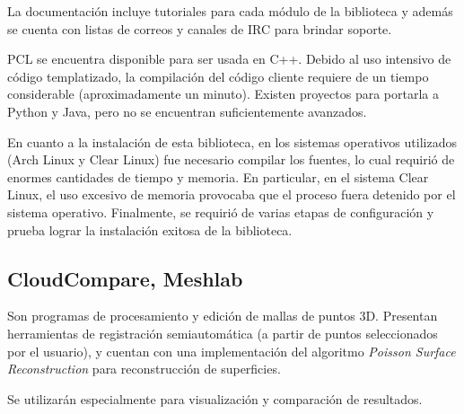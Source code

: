 	La documentación incluye tutoriales para cada módulo de la biblioteca y
	además se cuenta con listas de correos y canales de IRC para brindar
	soporte.

	PCL se encuentra disponible para ser usada en C++.
	Debido al uso intensivo de código templatizado, la compilación del
	código cliente requiere de un tiempo considerable (aproximadamente un minuto).
	Existen proyectos para portarla a Python y Java, pero no se encuentran
	suficientemente avanzados.

	En cuanto a la instalación de esta biblioteca, en los sistemas operativos
	utilizados (Arch Linux y Clear Linux) fue necesario compilar los fuentes,
	lo cual requirió de enormes cantidades de tiempo y memoria.
	En particular, en el sistema Clear Linux, el uso excesivo de memoria provocaba
	que el proceso fuera detenido por el sistema operativo.
	Finalmente, se requirió de varias etapas de configuración y prueba lograr
	la instalación exitosa de la biblioteca.




	\subsection{CloudCompare, Meshlab}
	Son programas de procesamiento y edición de mallas de puntos 3D.  Presentan
	herramientas de registración semiautomática (a partir de puntos
	seleccionados por el usuario), y cuentan con una implementación del
	algoritmo \emph{Poisson Surface Reconstruction} para reconstrucción de
	superficies.

	Se utilizarán especialmente para visualización y comparación de resultados.
